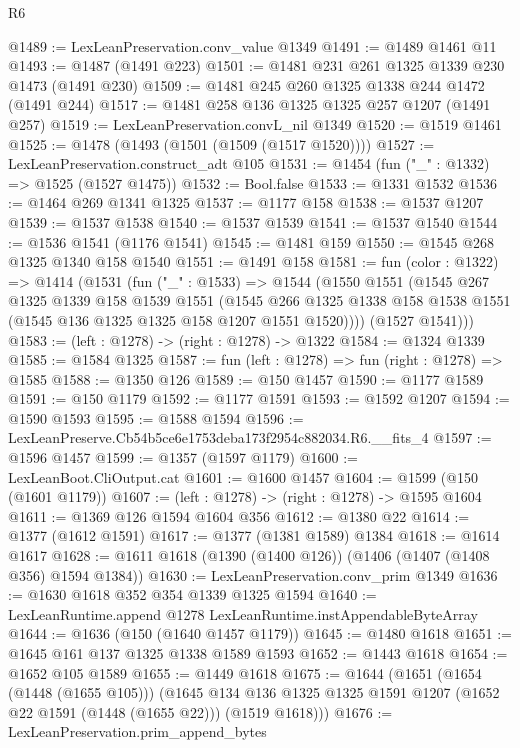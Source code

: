 \begin{lexlean}{R6}
\begin{coremodule}
@1489 := LexLeanPreservation.conv_value @1349
@1491 := @1489 @1461 @11
@1493 := @1487 (@1491 @223)
@1501 := @1481 @231 @261 @1325 @1339 @230 @1473 (@1491 @230)
@1509 := @1481 @245 @260 @1325 @1338 @244 @1472 (@1491 @244)
@1517 := @1481 @258 @136 @1325 @1325 @257 @1207 (@1491 @257)
@1519 := LexLeanPreservation.convL_nil @1349
@1520 := @1519 @1461
@1525 := @1478 (@1493 (@1501 (@1509 (@1517 @1520))))
@1527 := LexLeanPreservation.construct_adt @105
@1531 := @1454 (fun ("_" : @1332) => @1525 (@1527 @1475))
@1532 := Bool.false
@1533 := @1331 @1532
@1536 := @1464 @269 @1341 @1325
@1537 := @1177 @158
@1538 := @1537 @1207
@1539 := @1537 @1538
@1540 := @1537 @1539
@1541 := @1537 @1540
@1544 := @1536 @1541 (@1176 @1541)
@1545 := @1481 @159
@1550 := @1545 @268 @1325 @1340 @158 @1540
@1551 := @1491 @158
@1581 := fun (color : @1322) =>
  @1414
    (@1531
      (fun ("_" : @1533) =>
      @1544
        (@1550
          @1551
          (@1545
            @267
            @1325
            @1339
            @158
            @1539
            @1551
            (@1545
              @266
              @1325
              @1338
              @158
              @1538
              @1551
              (@1545 @136 @1325 @1325 @158 @1207 @1551 @1520))))
        (@1527 @1541)))
@1583 := (left : @1278) -> (right : @1278) -> @1322
@1584 := @1324 @1339
@1585 := @1584 @1325
@1587 := fun (left : @1278) => fun (right : @1278) => @1585
@1588 := @1350 @126
@1589 := @150 @1457
@1590 := @1177 @1589
@1591 := @150 @1179
@1592 := @1177 @1591
@1593 := @1592 @1207
@1594 := @1590 @1593
@1595 := @1588 @1594
@1596 := LexLeanPreserve.Cb54b5ce6e1753deba173f2954c882034.R6.__fits_4
@1597 := @1596 @1457
@1599 := @1357 (@1597 @1179)
@1600 := LexLeanBoot.CliOutput.cat
@1601 := @1600 @1457
@1604 := @1599 (@150 (@1601 @1179))
@1607 := (left : @1278) -> (right : @1278) -> @1595 @1604
@1611 := @1369 @126 @1594 @1604 @356
@1612 := @1380 @22
@1614 := @1377 (@1612 @1591)
@1617 := @1377 (@1381 @1589) @1384
@1618 := @1614 @1617
@1628 := @1611 @1618 (@1390 (@1400 @126)) (@1406 (@1407 (@1408 @356) @1594 @1384))
@1630 := LexLeanPreservation.conv_prim @1349
@1636 := @1630 @1618 @352 @354 @1339 @1325 @1594
@1640 := LexLeanRuntime.append @1278 LexLeanRuntime.instAppendableByteArray
@1644 := @1636 (@150 (@1640 @1457 @1179))
@1645 := @1480 @1618
@1651 := @1645 @161 @137 @1325 @1338 @1589 @1593
@1652 := @1443 @1618
@1654 := @1652 @105 @1589
@1655 := @1449 @1618
@1675 := @1644
    (@1651
      (@1654 (@1448 (@1655 @105)))
      (@1645 @134 @136 @1325 @1325 @1591 @1207 (@1652 @22 @1591 (@1448 (@1655 @22))) (@1519 @1618)))
@1676 := LexLeanPreservation.prim_append_bytes

\end{coremodule}
\end{lexlean}
